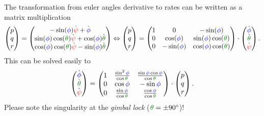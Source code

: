 The transformation from euler angles derivative to rates can be written as a matrix multiplication
\begin{equation}
\begin{pmatrix} p\\q\\r \end{pmatrix} = 
\begin{pmatrix}
- \sin (\Roll) \dot{\Yaw} + \dot{\Roll} \\
\sin (\Roll) \cos (\Pitch) \dot{\Yaw} + \cos (\Roll) \dot{\Pitch} \\
\cos (\Roll) \cos (\Pitch) \dot{\Yaw} - \sin (\Roll) \dot{\Pitch}
\end{pmatrix} \Leftrightarrow \begin{pmatrix} p\\q\\r \end{pmatrix} = 
\begin{pmatrix}
1 & 0 				& -\sin (\Roll) \\
0 & \cos (\Roll)	& \sin (\Roll) \cos (\Pitch) \\
0 & -\sin (\Roll)	& \cos (\Roll) \cos (\Pitch)
\end{pmatrix} \multiplication \begin{pmatrix}
\dot{\Roll} \\
\dot{\Pitch} \\
\dot{\Yaw}
\end{pmatrix}.
\end{equation}
This can be solved easily to
\begin{equation}
\begin{pmatrix}\dot{\Roll} \\ \dot{\Pitch} \\ \dot{\Yaw} \end{pmatrix} = 
\begin{pmatrix}
1 & \frac{ \sin^2 \Roll }{\cos \Pitch}	& \frac{\sin \Roll \cos \Roll}{\cos \Pitch}	\\
0 & \cos \Roll							& -\sin \Roll	\\
0 & \frac{\sin \Roll}{\cos \Pitch}		& \frac{\cos \Roll}{\cos \Pitch}
\end{pmatrix} \multiplication \begin{pmatrix} p\\q\\r \end{pmatrix}.
\end{equation}
Please note the singularity at the \emph{gimbal lock} ($\Pitch = \pm 90^{\circ }$)!

